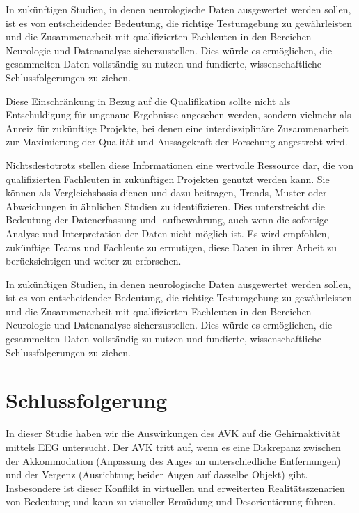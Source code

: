 \documentclass[conference]{IEEEtran}
\begin{document}
\begin{myitemize}
    In zukünftigen Studien, in denen neurologische Daten ausgewertet werden sollen, ist es von entscheidender Bedeutung, die richtige Testumgebung zu gewährleisten und die Zusammenarbeit mit qualifizierten Fachleuten in den Bereichen Neurologie und Datenanalyse sicherzustellen. Dies würde es ermöglichen, die gesammelten Daten vollständig zu nutzen und fundierte, wissenschaftliche Schlussfolgerungen zu ziehen. 
    
    Diese Einschränkung in Bezug auf die Qualifikation sollte nicht als Entschuldigung für ungenaue Ergebnisse angesehen werden, sondern vielmehr als Anreiz für zukünftige Projekte, bei denen eine interdisziplinäre Zusammenarbeit zur Maximierung der Qualität und Aussagekraft der Forschung angestrebt wird.

    Nichtsdestotrotz stellen diese Informationen eine wertvolle Ressource dar, die von qualifizierten Fachleuten in zukünftigen Projekten genutzt werden kann. Sie können als Vergleichsbasis dienen und dazu beitragen, Trends, Muster oder Abweichungen in ähnlichen Studien zu identifizieren. Dies unterstreicht die Bedeutung der Datenerfassung und -aufbewahrung, auch wenn die sofortige Analyse und Interpretation der Daten nicht möglich ist. Es wird empfohlen, zukünftige Teams und Fachleute zu ermutigen, diese Daten in ihrer Arbeit zu berücksichtigen und weiter zu erforschen.

    In zukünftigen Studien, in denen neurologische Daten ausgewertet werden sollen, ist es von entscheidender Bedeutung, die richtige Testumgebung zu gewährleisten und die Zusammenarbeit mit qualifizierten Fachleuten in den Bereichen Neurologie und Datenanalyse sicherzustellen. Dies würde es ermöglichen, die gesammelten Daten vollständig zu nutzen und fundierte, wissenschaftliche Schlussfolgerungen zu ziehen.
\end{myitemize}

\section{Schlussfolgerung}
In dieser Studie haben wir die Auswirkungen des AVK auf die Gehirnaktivität mittels EEG untersucht. Der AVK tritt auf, wenn es eine Diskrepanz zwischen der Akkommodation (Anpassung des Auges an unterschiedliche Entfernungen) und der Vergenz (Ausrichtung beider Augen auf dasselbe Objekt) gibt. Insbesondere ist dieser Konflikt in virtuellen und erweiterten Realitätsszenarien von Bedeutung und kann zu visueller Ermüdung und Desorientierung führen.
\end{document}
